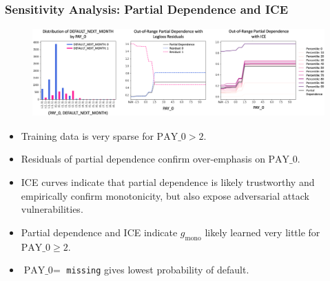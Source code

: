 \documentclass[11pt,
               aspectratio=169,
               hyperref={colorlinks}
               ]{beamer}
\begin{document}
			\begin{frame}[t]
		
				\frametitle{\textbf{Sensitivity Analysis}: Partial Dependence and ICE}
				\vspace{-15pt}
				\begin{figure}
					\begin{center}
						\includegraphics[height=96pt]{../img/pd.png}
					\end{center}
				\end{figure}
				\vspace{-10pt}
				\begin{itemize}	
					\item \scriptsize Training data is very sparse for $\text{PAY\_0} > 2$.\\
					\item Residuals of partial dependence confirm over-emphasis on $\text{PAY\_0}$.
					\item ICE curves indicate that partial dependence is likely trustworthy and empirically confirm monotonicity, but also expose adversarial attack vulnerabilities.
					\item Partial dependence and ICE indicate $g_{\text{mono}}$ likely learned very little for $\text{PAY\_0} \geq 2$.
					\item $\text{PAY\_0} = $ \texttt{missing} gives lowest probability of default.
				\end{itemize}\normalsize
		
			\end{frame}
\end{document}
